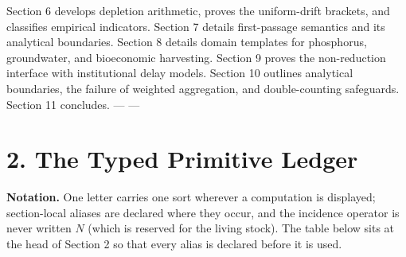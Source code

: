 \documentclass[11pt]{article}
\begin{document}
\begin{itemize}
Section 6 develops depletion arithmetic, proves the uniform-drift brackets, and classifies empirical indicators. Section 7 details first-passage semantics and its analytical boundaries. Section 8 details domain templates for phosphorus, groundwater, and bioeconomic harvesting. Section 9 proves the non-reduction interface with institutional delay models. Section 10 outlines analytical boundaries, the failure of weighted aggregation, and double-counting safeguards. Section 11 concludes. --- ---
\end{itemize}

\section*{2. The Typed Primitive Ledger}\label{2-the-typed-primitive-ledger}

\textbf{Notation.} One letter carries one sort wherever a computation is displayed; section-local aliases are declared where they occur, and the incidence operator is never written \(N\) (which is reserved for the living stock). The table below sits at the head of Section 2 so that every alias is declared before it is used.
\end{document}
